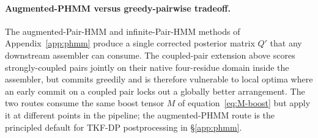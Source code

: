 \paragraph{Augmented-PHMM versus greedy-pairwise tradeoff.}
The augmented-Pair-HMM and infinite-Pair-HMM methods of
Appendix~\ref{app:phmm} produce a single corrected posterior
matrix $Q'$ that any downstream assembler can consume. The
coupled-pair extension above scores strongly-coupled pairs jointly
on their native four-residue domain inside the assembler, but
commits greedily and is therefore vulnerable to local optima where
an early commit on a coupled pair locks out a globally better
arrangement. The two routes consume the same boost tensor $M$ of
equation~\ref{eq:M-boost} but apply it at different points in the
pipeline; the augmented-PHMM route is the principled default for
TKF-DP postprocessing in \S\ref{app:phmm}.
